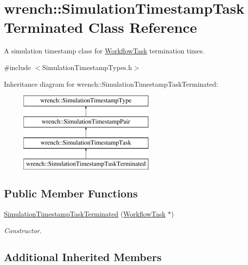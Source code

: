 \hypertarget{classwrench_1_1_simulation_timestamp_task_terminated}{}\section{wrench\+:\+:Simulation\+Timestamp\+Task\+Terminated Class Reference}
\label{classwrench_1_1_simulation_timestamp_task_terminated}


A simulation timestamp class for \hyperlink{classwrench_1_1_workflow_task}{Workflow\+Task} termination times.  




{\ttfamily \#include $<$Simulation\+Timestamp\+Types.\+h$>$}

Inheritance diagram for wrench\+:\+:Simulation\+Timestamp\+Task\+Terminated\+:\begin{figure}[H]
\begin{center}
\leavevmode
\includegraphics[height=4.000000cm]{classwrench_1_1_simulation_timestamp_task_terminated}
\end{center}
\end{figure}
\subsection*{Public Member Functions}
\begin{DoxyCompactItemize}
\item 
\hyperlink{classwrench_1_1_simulation_timestamp_task_terminated_a9a2914387e4cebfb299296f36d8f0efb}{Simulation\+Timestamp\+Task\+Terminated} (\hyperlink{classwrench_1_1_workflow_task}{Workflow\+Task} $\ast$)
\begin{DoxyCompactList}\small\item\em Constructor. \end{DoxyCompactList}\end{DoxyCompactItemize}
\subsection*{Additional Inherited Members}


